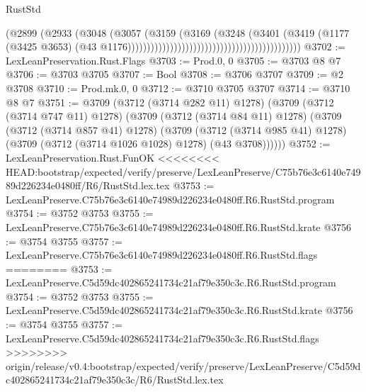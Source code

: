 \begin{lexlean}{RustStd}
\begin{coremodule}
{\begin{coremodule}
{{{{{{{{{{{{{{{{{{{{{{{{{{{{{{{                                                                        (@2899
                                                                          (@2933
                                                                            (@3048
                                                                              (@3057
                                                                                (@3159
                                                                                  (@3169
                                                                                    (@3248
                                                                                      (@3401
                                                                                        (@3419
                                                                                          (@1177
                                                                                            (@3425
                                                                                              @3653)
                                                                                            (@43
                                                                                              @1176)))))))))))))))))))))))))))))))))))))))))))))
@3702 := LexLeanPreservation.Rust.Flags
@3703 := Prod.{0, 0}
@3705 := @3703 @8 @7
@3706 := @3703 @3705
@3707 := Bool
@3708 := @3706 @3707
@3709 := @2 @3708
@3710 := Prod.mk.{0, 0}
@3712 := @3710 @3705 @3707
@3714 := @3710 @8 @7
@3751 := @3709
    (@3712 (@3714 @282 @11) @1278)
    (@3709
      (@3712 (@3714 @747 @11) @1278)
      (@3709
        (@3712 (@3714 @84 @11) @1278)
        (@3709
          (@3712 (@3714 @857 @41) @1278)
          (@3709
            (@3712 (@3714 @985 @41) @1278)
            (@3709 (@3712 (@3714 @1026 @1028) @1278) (@43 @3708))))))
@3752 := LexLeanPreservation.Rust.FunOK
<<<<<<<< HEAD:bootstrap/expected/verify/preserve/LexLeanPreserve/C75b76e3c6140e74989d226234e0480ff/R6/RustStd.lex.tex
@3753 := LexLeanPreserve.C75b76e3c6140e74989d226234e0480ff.R6.RustStd.program
@3754 := @3752 @3753
@3755 := LexLeanPreserve.C75b76e3c6140e74989d226234e0480ff.R6.RustStd.krate
@3756 := @3754 @3755
@3757 := LexLeanPreserve.C75b76e3c6140e74989d226234e0480ff.R6.RustStd.flags
========
@3753 := LexLeanPreserve.C5d59dc402865241734c21af79e350c3c.R6.RustStd.program
@3754 := @3752 @3753
@3755 := LexLeanPreserve.C5d59dc402865241734c21af79e350c3c.R6.RustStd.krate
@3756 := @3754 @3755
@3757 := LexLeanPreserve.C5d59dc402865241734c21af79e350c3c.R6.RustStd.flags
>>>>>>>> origin/release/v0.4:bootstrap/expected/verify/preserve/LexLeanPreserve/C5d59dc402865241734c21af79e350c3c/R6/RustStd.lex.tex
}}}}}}}}}}}}}}}}}}}}}}}}}}}}}}}
\end{coremodule}}
\end{coremodule}
\end{lexlean}
